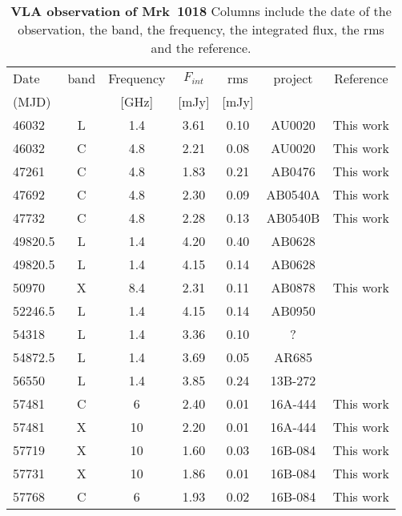 \begin{table}
\centering
\caption{{\bf VLA observation of Mrk~1018} Columns include the date of the observation, the band, the frequency, the integrated flux, the rms and the reference.}
\label{tab:tableradio}
\begin{tabular}{lcccccc}
\hline
\hline
 
 Date &   band  & Frequency  &$F_{int}$  &  rms & project & Reference  \\ 
 (MJD)&                   &   [GHz]   &[mJy]     &[mJy] &                    &            
 \\ \hline
46032 & L & 1.4 & 3.61 & 0.10 & AU0020 &  This work\\ 
46032 & C & 4.8 & 2.21 & 0.08 & AU0020 &  This work\\ 
47261 & C & 4.8 & 1.83 & 0.21 & AB0476 &  This work\\ 
47692 & C & 4.8 & 2.30 & 0.09 & AB0540A &  This work\\ 
47732 & C & 4.8 & 2.28 & 0.13 & AB0540B &  This work\\ 
49820.5 & L & 1.4 & 4.20 & 0.40 & AB0628 & \citet{1998AJ....115.1693C} \\ 
49820.5 & L & 1.4 & 4.15 & 0.14 & AB0628 & \citet{1997ApJ...475..479W} \\ 
50970 & X & 8.4 & 2.31 & 0.11 & AB0878 &  This work\\ 
52246.5 & L & 1.4 & 4.15 & 0.14 & AB0950 & \citet{2003yCat.8071....0B} \\ 
54318 & L & 1.4 & 3.36 & 0.10 & ? & \citet{2012yCat.8090....0B} \\ 
54872.5 & L & 1.4 & 3.69 & 0.05 & AR685 & \citet{2011AJ....142....3H} \\ 
56550 & L & 1.4 & 3.85 & 0.24 & 13B-272 & \citet{2016MNRAS.460.4433H} \\ 
57481 & C & 6 & 2.40 & 0.01 & 16A-444 &  This work\\ 
57481 & X & 10 & 2.20 & 0.01 & 16A-444 &  This work\\ 
57719 & X & 10 & 1.60 & 0.03 & 16B-084 &  This work\\ 
57731 & X & 10 & 1.86 & 0.01 & 16B-084 &  This work\\ 
57768 & C & 6 & 1.93 & 0.02 & 16B-084 &  This work\\ \hline 
\end{tabular}   
\end{table}



